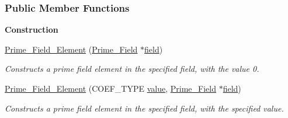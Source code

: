 \subsubsection*{Public Member Functions}
\begin{Indent}\textbf{ Construction}\par
\begin{DoxyCompactItemize}
\item 
\hyperlink{group___fields_group_a52db0c88a43489efba10059b71d832ec}{Prime\+\_\+\+Field\+\_\+\+Element} (\hyperlink{group___fields_group_class_prime___field}{Prime\+\_\+\+Field} $\ast$\hyperlink{group___fields_group_af9641451c05d26a2016e21a6ef054c40}{field})
\begin{DoxyCompactList}\small\item\em Constructs a prime field element in the specified field, with the value 0. \end{DoxyCompactList}\item 
\hyperlink{group___fields_group_a6868c9957c5ddb60b2313d51b0565636}{Prime\+\_\+\+Field\+\_\+\+Element} (C\+O\+E\+F\+\_\+\+T\+Y\+PE \hyperlink{group___fields_group_aa9c68761643afa0b22863904bdfe7e83}{value}, \hyperlink{group___fields_group_class_prime___field}{Prime\+\_\+\+Field} $\ast$\hyperlink{group___fields_group_af9641451c05d26a2016e21a6ef054c40}{field})
\begin{DoxyCompactList}\small\item\em Constructs a prime field element in the specified field, with the specified value. \end{DoxyCompactList}\end{DoxyCompactItemize}
\end{Indent}
